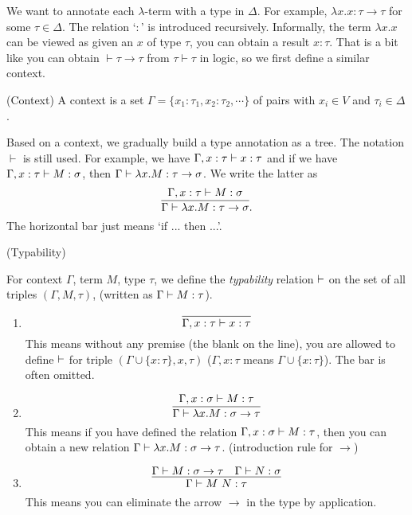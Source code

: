We want to annotate each $\lambda$-term with a type in $\Delta$. 
For example, $\lambda x. x: \tau\to \tau$ for some $\tau\in \Delta$. 
The relation `$:$' is introduced recursively. Informally, the term 
$\lambda x. x$ can be viewed as given an $x$ of type $\tau$, you can
obtain a result $x:\tau$. That is a bit like you can obtain $\vdash
\tau\to\tau$ from $\tau\vdash\tau$ in logic, so we first define a
similar context. 

\begin{definition} (Context)
    A context is a set $\Gamma = \{x_1: \tau_1, x_2:\tau_2, \cdots\}$
    of pairs with $x_i\in V$ and $\tau_i\in \Delta$.
\end{definition}

Based on a context, we gradually build a type annotation as a tree. 
The notation $\vdash$ is still used. For example, we have 
$\Gamma,x:\tau\vdash x:\tau$ and if we have $\Gamma,x:\tau\vdash 
M:\sigma$, then $\Gamma\vdash \lambda x. M:\tau\to\sigma$. We write
the latter as 
$$
\infer{\Gamma\proves \lambda x. M:\tau\to\sigma}{\Gamma,x:\tau\proves M:\sigma}.
$$
The horizontal bar just means `if ... then ...'.

\begin{definition} (Typability)

For context $\Gamma$, term $M$, type $\tau$, we define the {\it typability}
relation $\vdash$ on the set of all triples $(\Gamma, M, \tau)$, 
(written as $\Gamma\vdash M:\tau$).

\begin{enumerate}
    \item $$\infer{\Gamma, x:\tau\proves x:\tau}{}$$
    This means without any premise (the blank on the line), you
    are allowed to define $\vdash$ for triple 
    $(\Gamma\cup\{x:\tau\}, x, \tau)$
    ($\Gamma,x:\tau$ means $\Gamma\cup\{x:\tau\}$).
    The bar is often omitted.
    \item $$\infer{\Gamma\proves\lambda x.M:\sigma\to\tau}{\Gamma,x:\sigma\proves M:\tau}$$
    This means if you have defined the relation $\Gamma,x:\sigma\vdash M:\tau$,
    then you can obtain a new relation $\Gamma\vdash\lambda x.M:\sigma\to\tau$.
    (introduction rule for $\to$)
    \item $$\infer{\Gamma\proves M\ N:\tau}{\Gamma\proves M:\sigma\to\tau & \Gamma\proves N:\sigma}$$
    This means you can eliminate the arrow $\to$ in the type by application.
\end{enumerate}

\end{definition}

